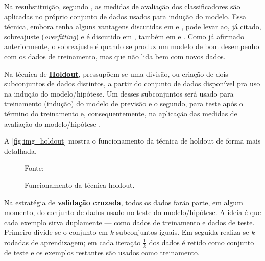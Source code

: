 Na resubstituição, segundo , as medidas de avaliação dos classificadores são aplicadas no próprio conjunto de dados usados para indução do modelo. Essa técnica, embora tenha alguns vantagens discutidas em  e , pode levar ao, já citado, sobreajuste (\textit{overfitting}) e é discutido em , também em  e . Como já afirmado anteriormente, o sobreajuste é quando se produz um modelo de bom desempenho com os dados de treinamento, mas que não lida bem com novos dados.

Na técnica de \textbf{\underline{Holdout}}, pressupõem-se uma divisão, ou criação de dois subconjuntos de dados distintos, a partir do conjunto de dados disponível pra uso na indução do modelo/hipótese. Um desses subconjuntos será usado para treinamento (indução) do modelo de previsão e o segundo, para teste após o término do treinamento e, consequentemente, na aplicação das medidas de avaliação do modelo/hipótese \cite{Boscarioli2017}.

A \autoref{fig:img_holdout} mostra o funcionamento da técnica de holdout de forma mais detalhada.
\begin{figure}[h!]
	\centering
	\caption{Funcionamento da técnica holdout.}
	
	{\scriptsize Fonte:\cite{aprenda_mineracao_fernando_amaral16}}
	\label{fig:img_holdout}
\end{figure}

Na estratégia de \textbf{\underline{validação cruzada}}, todos os dados farão parte, em algum momento, do conjunto de dados usado no teste do modelo/hipótese. A ideia é que cada exemplo sirva duplamente --- como dados de treinamento e dados de teste. Primeiro divide-se o conjunto em $k$ subconjuntos iguais. Em seguida realiza-se $k$ rodadas de aprendizagem; em cada iteração $\frac{1}{k}$ dos dados é retido como conjunto de teste e os exemplos restantes são usados como treinamento. 

